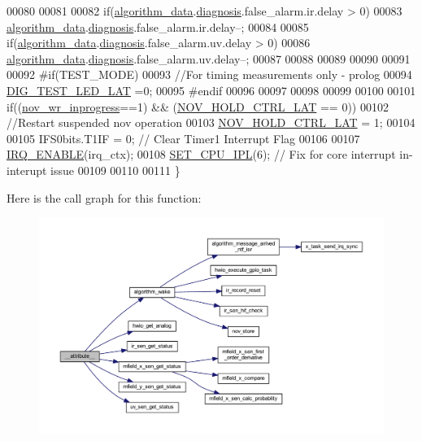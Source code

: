 \begin{DoxyCode}
00080 
00081 
00082      \textcolor{keywordflow}{if}(\hyperlink{a00016_a183caa40cd01e79ee309cc9c4a225197}{algorithm\_data}.\hyperlink{a00016_a16f85d57ec98b4ad05f5a2e10536b3c6}{diagnosis}.false\_alarm.ir.delay > 0)
00083         \hyperlink{a00016_a183caa40cd01e79ee309cc9c4a225197}{algorithm\_data}.\hyperlink{a00016_a16f85d57ec98b4ad05f5a2e10536b3c6}{diagnosis}.false\_alarm.ir.delay--;
00084 
00085      \textcolor{keywordflow}{if}(\hyperlink{a00016_a183caa40cd01e79ee309cc9c4a225197}{algorithm\_data}.\hyperlink{a00016_a16f85d57ec98b4ad05f5a2e10536b3c6}{diagnosis}.false\_alarm.uv.delay > 0)
00086         \hyperlink{a00016_a183caa40cd01e79ee309cc9c4a225197}{algorithm\_data}.\hyperlink{a00016_a16f85d57ec98b4ad05f5a2e10536b3c6}{diagnosis}.false\_alarm.uv.delay--;
00087 
00088     
00089      
00090 
00091 
00092 \textcolor{preprocessor}{#if(TEST\_MODE)}
00093     \textcolor{comment}{//For timing measurements only - prolog}
00094     \hyperlink{a00058_a4c044f78fb8b7ee19bfdb5d2b204b50e}{DIG\_TEST\_LED\_LAT} =0;     
00095 \textcolor{preprocessor}{#endif}
00096 
00097 
00098 
00099      
00100   
00101     \textcolor{keywordflow}{if}((\hyperlink{a00029_a56fe014653ebdce270aeac664bf86e65}{nov\_wr\_inprogress}==1) && (\hyperlink{a00029_aa03a6ff293decd7159ed1642ccbac971}{NOV\_HOLD\_CTRL\_LAT} == 0))
00102         \textcolor{comment}{//Restart suspended nov operation}
00103     \hyperlink{a00029_aa03a6ff293decd7159ed1642ccbac971}{NOV\_HOLD\_CTRL\_LAT} = 1;
00104 
00105     IFS0bits.T1IF = 0;    \textcolor{comment}{// Clear Timer1 Interrupt Flag}
00106     
00107    \hyperlink{a00033_abc8e0f43382f8b0fdf60d35a93c20c57}{IRQ\_ENABLE}(irq\_ctx);
00108    \hyperlink{a00015_a34d4c80d85281a545f3c7f1530803d65}{SET\_CPU\_IPL}(6);       \textcolor{comment}{// Fix for core interrupt in-interupt issue}
00109 
00110 
00111 \}
\end{DoxyCode}


Here is the call graph for this function\+:\nopagebreak
\begin{figure}[H]
\begin{center}
\leavevmode
\includegraphics[width=350pt]{dd/d32/a00041_a2068c3c2584547dbc1c8b9bca2d55b18_cgraph}
\end{center}
\end{figure}


